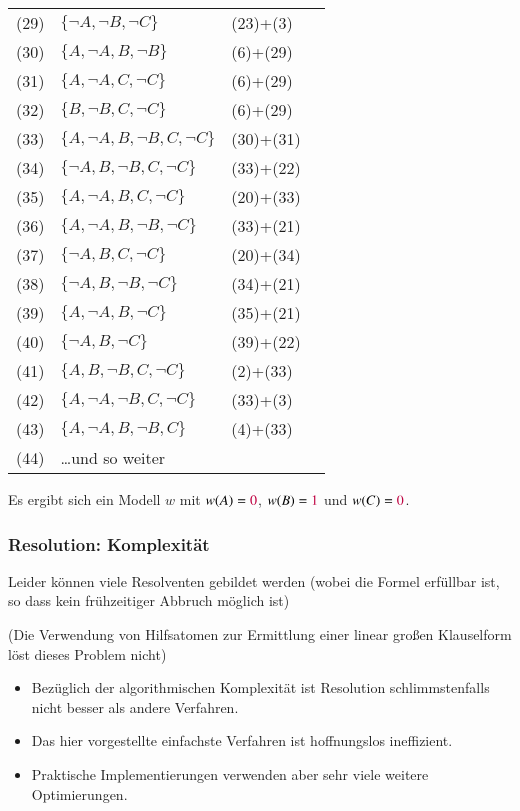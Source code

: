 \documentclass[aspectratio=1610,onlymath]{beamer}
\begin{document}
\begin{frame}
\begin{minipage}{5cm}
{\begin{tabular}[t]{rlll}
%
(29) & $\{\neg A,\neg B,\neg C\}$ & (23)+(3)\\
(30) & $\{A,\neg A,B,\neg B\}$ & (6)+(29)\\
(31) & $\{A,\neg A,C,\neg C\}$ & (6)+(29)\\
(32) & $\{B,\neg B,C,\neg C\}$ & (6)+(29)\\
%
(33) & $\{A,\neg A, B,\neg B,C,\neg C\}$ & (30)+(31)\\
(34) & $\{\neg A, B,\neg B,C,\neg C\}$ & (33)+(22)\\
(35) & $\{A, \neg A, B,C,\neg C\}$ & (20)+(33)\\
(36) & $\{A, \neg A, B,\neg B,\neg C\}$ & (33)+(21)\\
(37) & $\{\neg A, B,C,\neg C\}$ & (20)+(34)\\
(38) & $\{\neg A, B,\neg B,\neg C\}$ & (34)+(21)\\
(39) & $\{A, \neg A, B,\neg C\}$ & (35)+(21)\\
(40) & $\{\neg A, B,\neg C\}$ & (39)+(22)\\
(41) & $\{A, B,\neg B,C,\neg C\}$ & (2)+(33)\\
(42) & $\{A,\neg A, \neg B,C,\neg C\}$ & (33)+(3)\\
(43) & $\{A,\neg A, B,\neg B,C\}$ & (4)+(33)\\
(44) & \ldots und so weiter
\end{tabular}}\pause
\vspace{5mm}

Es ergibt sich ein Modell $w$ mit
$w(A)=\textcolor{purple}{0}$, $w(B)=\textcolor{purple}{1}$ und $w(C)=\textcolor{purple}{0}$.
\end{minipage}

\end{frame}

\begin{frame}\frametitle{Resolution: Komplexität}

Leider können  viele Resolventen gebildet werden
(wobei die Formel erfüllbar ist, so dass kein frühzeitiger Abbruch möglich ist)
\bigskip

\textcolor{devilscss}{(Die Verwendung von Hilfsatomen zur Ermittlung einer linear großen Klauselform löst dieses Problem nicht)}
\bigskip

\begin{itemize}
\item Bezüglich der algorithmischen Komplexität ist Resolution schlimmstenfalls
\alert{nicht besser als andere Verfahren}.
\item Das hier vorgestellte einfachste Verfahren ist \alert{hoffnungslos ineffizient}.
\item Praktische Implementierungen verwenden aber sehr \alert{viele weitere Optimierungen}.
\end{itemize}

\end{frame}
\end{document}
